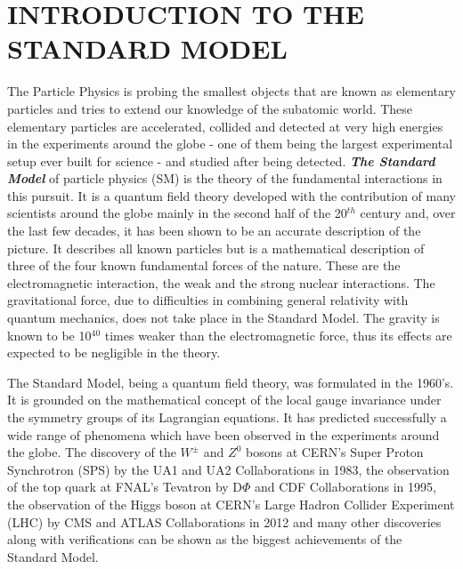 \chapter{INTRODUCTION TO THE STANDARD MODEL}\label{Ch1}

The Particle Physics is probing the smallest objects that are known as elementary particles and tries to extend our knowledge of the subatomic world. These elementary particles are accelerated, collided and detected at very high energies in the experiments around the globe - one of them being the largest experimental setup ever built for science - and studied after being detected. \textbf{\textit{The Standard Model}} of particle physics (SM) is the theory of the fundamental interactions in this pursuit. It is a quantum field theory developed with the contribution of many scientists around the globe mainly in the second half of the 20$^{th}$ century and, over the last few decades, it has been shown to be an accurate description of the picture. It describes all known particles but is a mathematical description of three of the four known fundamental forces of the nature. These are the electromagnetic interaction, the weak and the strong nuclear interactions. The gravitational force, due to difficulties in combining general relativity with quantum mechanics, does not take place in the Standard Model. The gravity is known to be 10$^{40}$ times weaker than the electromagnetic force, thus its effects are expected to be negligible in the theory.

The Standard Model, being a quantum field theory, was formulated in the 1960's. It is grounded on the mathematical concept of the local gauge invariance under the symmetry groups of its Lagrangian equations. It has predicted successfully a wide range of phenomena which have been observed in the experiments around the globe. The discovery of the $W^\pm$ and $Z^0$ bosons at CERN's Super Proton Synchrotron (SPS) by the UA1 and UA2 Collaborations in 1983\cite{SPS-1, SPS-2, SPS-3, SPS-4, SPS-5}, the observation of the top quark at FNAL's Tevatron by D$\Phi$ and CDF Collaborations in 1995\cite{fnal-1, fnal-2}, the observation of the Higgs boson at CERN's Large Hadron Collider Experiment (LHC) by CMS and ATLAS Collaborations in 2012\cite{HiggsCMS,HiggsATLAS} and many other discoveries along with verifications can be shown as the biggest achievements of the Standard Model.

